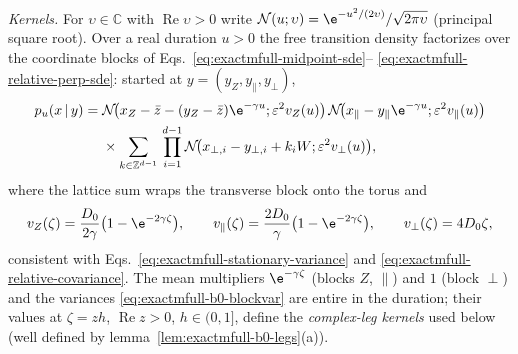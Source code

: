 \emph{Kernels.}
For \(\upsilon\in\mathbb C\) with \(\operatorname{Re}\upsilon>0\) write
\(\mathcal N(u;\upsilon)=\e^{-u^2/(2\upsilon)}/\sqrt{2\pi\upsilon}\)
(principal square root).  Over a real duration \(u>0\) the free transition
density factorizes over the coordinate blocks of
Eqs.~\eqref{eq:exactmfull-midpoint-sde}--%
\eqref{eq:exactmfull-relative-perp-sde}: started at
\(y=(y_Z,y_\parallel,y_\perp)\),
\begin{equation}
 \begin{split}
 p_u(x\,|\,y)
 ={}&\mathcal N\!\bigl(x_Z-\bar z-(y_Z-\bar z)\e^{-\gamma u};
   \varepsilon^2v_Z(u)\bigr)\,
  \mathcal N\!\bigl(x_\parallel-y_\parallel\e^{-\gamma u};
   \varepsilon^2v_\parallel(u)\bigr)\\
 &\times
  \sum_{k\in\mathbb Z^{d-1}}\,
  \prod_{i=1}^{d-1}
  \mathcal N\!\bigl(x_{\perp,i}-y_{\perp,i}+k_iW;
   \varepsilon^2v_\perp(u)\bigr),
 \end{split}
 \label{eq:exactmfull-b0-kernels}
\end{equation}
where the lattice sum wraps the transverse block onto the torus and
\begin{equation}
 v_Z(\zeta)=\frac{D_0}{2\gamma}\bigl(1-\e^{-2\gamma\zeta}\bigr),
 \qquad
 v_\parallel(\zeta)=\frac{2D_0}{\gamma}\bigl(1-\e^{-2\gamma\zeta}\bigr),
 \qquad
 v_\perp(\zeta)=4D_0\zeta,
 \label{eq:exactmfull-b0-blockvar}
\end{equation}
consistent with Eqs.~\eqref{eq:exactmfull-stationary-variance} and
\eqref{eq:exactmfull-relative-covariance}.  The mean multipliers
\(\e^{-\gamma\zeta}\) (blocks \(Z\), \(\parallel\)) and \(1\) (block
\(\perp\)) and the variances \eqref{eq:exactmfull-b0-blockvar} are entire in
the duration; their values at \(\zeta=zh\), \(\operatorname{Re}z>0\),
\(h\in(0,1]\), define the \emph{complex-leg kernels} used below (well
defined by lemma~\ref{lem:exactmfull-b0-legs}(a)).

